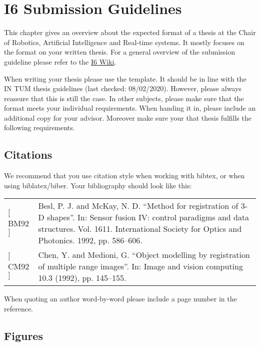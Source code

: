 \chapter{I6 Submission Guidelines}%

This chapter gives an overview about the expected format of a thesis at the Chair of Robotics, Artificial Intelligence and Real-time systems.
It mostly focuses on the format on your written thesis.
For a general overview of the submission guideline please refer to the  \underline{\href{https://wiki.tum.de/display/I6intern/Thesis+Submission+Guidelines}{I6 Wiki}}.

When writing your thesis please use the  template.
It should be in line with the IN TUM thesis guidelines (last checked: 08/02/2020).
However, please always reassure that this is still the case. In other subjects, please make sure that the format meets your individual requirements.
When handing it in, please include an additional copy for your advisor. Moreover make sure your that thesis fulfills the following requirements.

\section{Citations}

We recommend that you use \href{https://ctan.org/texarchive/bibliography/bibtex/contrib/german/din1505}{} citation style when working with bibtex, or  when using biblatex/biber. Your bibliography should look like this:

\begin{table}[htb]
    \begin{tabular}{lp{13.5cm}}
        $[$BM92$]$ & Besl, P. J. and McKay, N. D. “Method for registration of 3-D shapes”. In: Sensor
        fusion IV: control paradigms and data structures. Vol. 1611. International Society
        for Optics and Photonics. 1992, pp. 586–606.\\
        $[$CM92$]$ & Chen, Y. and Medioni, G. “Object modelling by registration of multiple range
        images”. In: Image and vision computing 10.3 (1992), pp. 145–155.\\
    \end{tabular}
\end{table}

When quoting an author word-by-word please include a page number in the reference.

\section{Figures}

